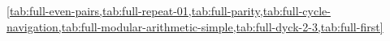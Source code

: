 \cref{tab:full-even-pairs,tab:full-repeat-01,tab:full-parity,tab:full-cycle-navigation,tab:full-modular-arithmetic-simple,tab:full-dyck-2-3,tab:full-first}